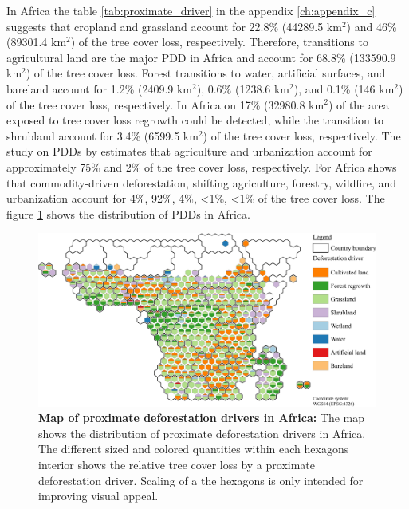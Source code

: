 			In Africa the table \ref{tab:proximate_driver} in the appendix \ref{ch:appendix_c} suggests that cropland and grassland account for 22.8\% (44289.5 km$^2$) and 46\% (89301.4 km$^2$) of the tree cover loss, respectively. Therefore, transitions to agricultural land are the major \ac{PDD} in Africa and account for 68.8\% (133590.9 km$^2$) of the tree cover loss. Forest transitions to water, artificial surfaces, and bareland account for 1.2\% (2409.9 km$^2$), 0.6\% (1238.6 km$^2$), and 0.1\% (146 km$^2$) of the tree cover loss, respectively. In Africa on 17\% (32980.8 km$^2$) of the area exposed to tree cover loss regrowth could be detected, while the transition to shrubland account for 3.4\% (6599.5 km$^2$) of the tree cover loss, respectively. The study on \acp{PDD} by \citeauthor{Hosonuma2012} estimates that agriculture and urbanization account for approximately 75\% and 2\% of the tree cover loss, respectively. For Africa \citeauthor{Curtis2018} shows that commodity-driven deforestation, shifting agriculture, forestry, wildfire, and urbanization account for 4\%, 92\%, 4\%, <1\%, <1\% of the tree cover loss.
			The figure \ref{fig:africa_driver} shows the distribution of \acp{PDD} in Africa.
			\begin{figure}[ht]
				\centering
				\includegraphics[scale=1]{img/africa_driver_frameless}
				\caption[Map of proximate deforestion drivers in Africa]{\textbf{Map of proximate deforestation drivers in Africa:} The map shows the distribution of proximate deforestation drivers in Africa. The different sized and colored quantities within each hexagons interior shows the relative tree cover loss by a proximate deforestation driver. Scaling of a the hexagons is only intended for improving visual appeal.}
				\label{fig:africa_driver}
			\end{figure}

